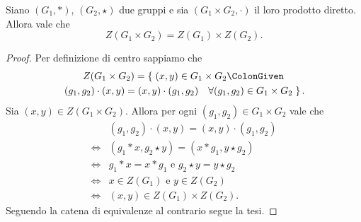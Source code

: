 \begin{proposition}
    Siano $(G_1, *)$, $(G_2, \star)$ due gruppi e sia $(G_1 \times G_2, \cdot)$ il loro prodotto diretto.
    Allora vale che \[
        Z(G_1 \times G_2) = Z(G_1) \times Z(G_2).
    \]
\end{proposition}
\begin{proof}
    Per definizione di centro sappiamo che \begin{multline*}
        Z(G_1 \times G_2) = \left\{\;(x, y) \in G_1 \times G_2 \ColonGiven \right. \\
        \left. (g_1, g_2) \cdot (x, y) = (x, y) \cdot (g_1, g_2) \quad \forall(g_1,g_2) \in G_1 \times G_2\;\right\}.  
    \end{multline*}
    Sia $(x, y) \in Z(G_1 \times G_2)$. Allora per ogni $ (g_1,g_2) \in G_1 \times G_2$ vale che \begin{align*}
        &(g_1, g_2) \cdot (x, y) = (x, y) \cdot (g_1, g_2) \\
        \iff &(g_1 * x, g_2 \star y) = (x * g_1, y \star g_2)\\
        \iff &g_1 * x = x*g_1 \text{ e } g_2 \star y = y \star g_2\\
        \iff &x \in Z(G_1) \text{ e } y \in Z(G_2)\\
        \iff &(x, y) \in Z(G_1) \times Z(G_2).
    \end{align*}
    Seguendo la catena di equivalenze al contrario segue la tesi.
\end{proof}

